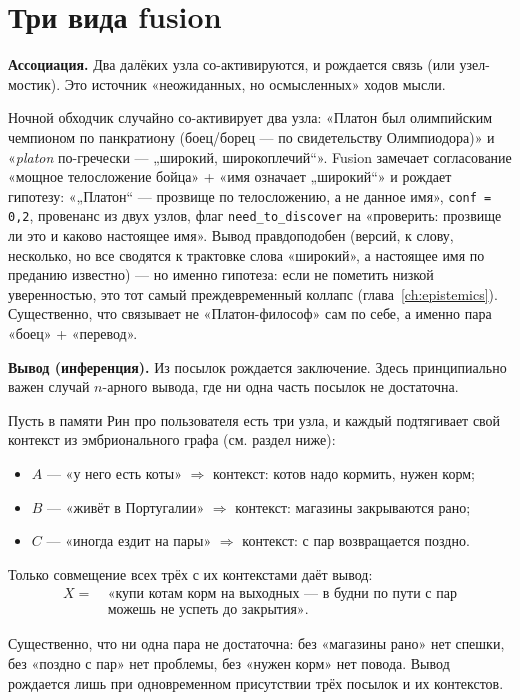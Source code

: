 \section{Три вида fusion}

\smallskip\noindent\textbf{Ассоциация.}
Два далёких узла со-активируются, и рождается связь (или узел-мостик). Это
источник «неожиданных, но осмысленных» ходов мысли.

\begin{workedbox}
Ночной обходчик случайно со-активирует два узла: «Платон был олимпийским
чемпионом по панкратиону (боец/борец --- по свидетельству Олимпиодора)» и
«\textit{platon} по-гречески --- „широкий, широкоплечий“». Fusion замечает
согласование «мощное телосложение бойца» + «имя означает „широкий“» и
рождает гипотезу: «„Платон“ --- прозвище по телосложению, а не данное имя»,
\texttt{conf = 0,2}, провенанс из двух узлов, флаг \texttt{need\_to\_discover}
на «проверить: прозвище ли это и каково настоящее имя». Вывод правдоподобен
(версий, к слову, несколько, но все сводятся к трактовке слова «широкий», а
настоящее имя по преданию известно) --- но именно гипотеза: если не пометить
низкой уверенностью, это тот самый преждевременный коллапс
(глава~\ref{ch:epistemics}). Существенно, что связывает не «Платон-философ»
сам по себе, а именно пара «боец» + «перевод».
\end{workedbox}

\smallskip\noindent\textbf{Вывод (инференция).}
Из посылок рождается заключение. Здесь принципиально важен случай $n$-арного
вывода, где ни одна часть посылок не достаточна.

\begin{workedbox}
Пусть в памяти Рин про пользователя есть три узла, и каждый подтягивает свой
контекст из эмбрионального графа (см. раздел ниже):
\begin{itemize}
\item $A$ --- «у него есть коты» $\Rightarrow$ контекст: котов надо кормить,
нужен корм;
\item $B$ --- «живёт в Португалии» $\Rightarrow$ контекст: магазины закрываются
рано;
\item $C$ --- «иногда ездит на пары» $\Rightarrow$ контекст: с пар возвращается
поздно.
\end{itemize}

Только совмещение всех трёх с их контекстами даёт вывод:
\[
\begin{aligned}
X =\ &\text{«купи котам корм на выходных --- в будни по пути с пар} \\
     &\text{можешь не успеть до закрытия»}.
\end{aligned}
\]

Существенно, что ни одна пара не достаточна: без «магазины рано» нет спешки,
без «поздно с пар» нет проблемы, без «нужен корм» нет повода. Вывод рождается
лишь при одновременном присутствии трёх посылок и их контекстов.
\end{workedbox}

